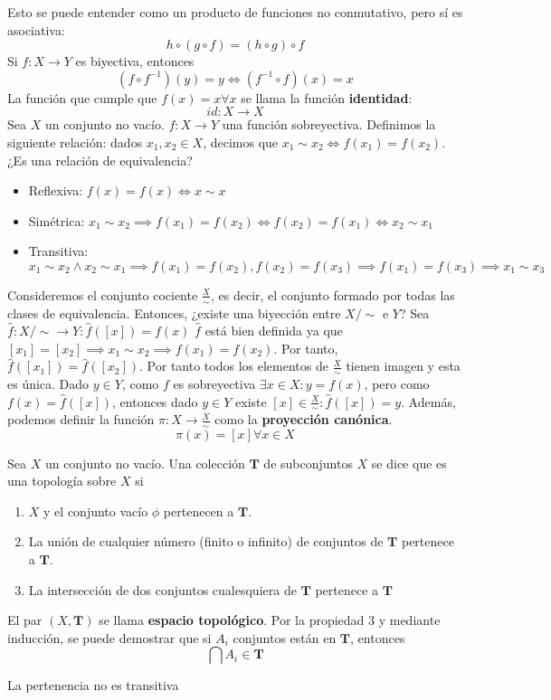 \documentclass{../Topologia.tex}
\begin{document}
Esto se puede entender como un producto de funciones no conmutativo, pero sí es asociativa:
$$
h\circ(g\circ f)=(h\circ g)\circ f
$$
Si $f:X\to Y$ es biyectiva, entonces
$$
(f\circ f^{-1})(y)=y \iff (f^{-1}\circ f)(x)=x
$$
La función que cumple que $f(x)=x \forall x$ se llama la función \textbf{identidad}:
$$
id:X\to X
$$
\vspace{1em}
Sea $X$ un conjunto no vacío. $f:X\to Y$ una función sobreyectiva. Definimos la siguiente relación: dados $x_{1},x_{2}\in X$, decimos que $x_{1} \sim x_{2} \iff f(x_{1})=f(x_{2})$.
¿Es una relación de equivalencia?
\begin{itemize}
    \item Reflexiva: $f(x)=f(x) \iff x \sim x$
    \item Simétrica: $x_{1}\sim x_{2} \implies f(x_{1})=f(x_{2})\iff f(x_{2})=f(x_{1})\iff x_{2}\sim x_{1}$
    \item Transitiva: $x_{1}\sim x_{2} \wedge x_{2}\sim x_{1} \implies f(x_{1})=f(x_{2}), f(x_{2})=f(x_{3})\implies f(x_{1})=f(x_{3})\implies x_{1}\sim x_{3}$
\end{itemize}
Consideremos el conjunto cociente $\frac{X}{\sim}$, es decir, el conjunto formado por todas las clases de equivalencia. Entonces, ¿existe una biyección entre $X / \sim$ e $Y$?
Sea $\hat{f}:X / \sim \to Y : \hat{f}([x])=f(x)$
$\hat{f}$ está bien definida ya que $[x_{1}]=[x_{2}] \implies x_{1}\sim x_{2} \implies f(x_{1})=f(x_{2})$. Por tanto, $\hat{f}([x_{1}])=\hat{f}([x_{2}])$. Por tanto todos los elementos de $\frac{X}{\sim}$ tienen imagen y esta es única. Dado $y \in Y$, como $f$ es sobreyectiva $\exists x \in X:y=f(x)$, pero como $f(x)=\hat{f}([x])$, entonces dado $y \in Y$ existe $[x] \in \frac{X}{\sim}:\hat{f}([x])=y$.
Además, podemos definir la función $\pi:X \to \frac{X}{\sim}$ como la \textbf{proyección canónica}.
$$
\pi(x)=[x] \forall x \in X
$$

\begin{defin}
Sea $X$ un conjunto no vacío. Una colección $\mathbf{T}$ de subconjuntos $X$ se dice que es una topología sobre $X$ si
\begin{enumerate}
    \item $X$ y el conjunto vacío $\phi$ pertenecen a $\mathbf{T}$.
    \item La unión de cualquier número (finito o infinito) de conjuntos de $\mathbf{T}$ pertenece a $\mathbf{T}$.
    \item La intersección de dos conjuntos cualesquiera de $\mathbf{T}$ pertenece a $\mathbf{T}$
\end{enumerate}
El par $(X,\mathbf{T})$ se llama \textbf{espacio topológico}.
Por la propiedad 3 y mediante inducción, se puede demostrar que si $A_{i}$ conjuntos están en $\mathbf{T}$, entonces
$$
\bigcap A_{i} \in \mathbf{T}
$$
\end{defin}
La pertenencia no es transitiva
\end{document}
